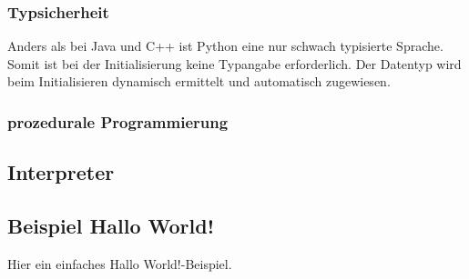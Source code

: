 \subsubsection{Typsicherheit}
Anders als bei Java und C++ ist Python eine nur schwach typisierte Sprache.
Somit ist bei der Initialisierung keine Typangabe erforderlich. 
Der Datentyp wird beim Initialisieren dynamisch ermittelt und automatisch zugewiesen.
\subsubsection{prozedurale Programmierung}
\subsection{Interpreter}


\subsection{Beispiel \glqq Hallo World!\grqq}
Hier ein einfaches \glqq Hallo World!\grqq -Beispiel.


